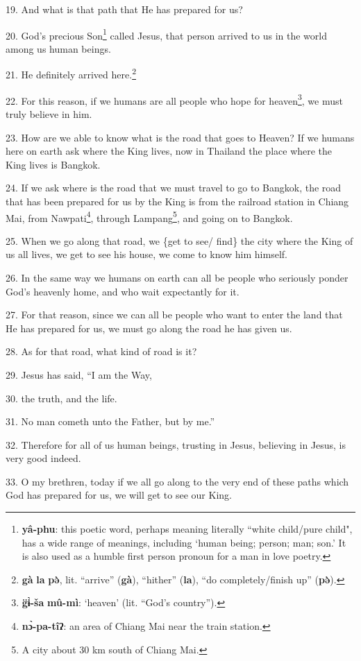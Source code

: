 19. And what is that path that He has prepared for us?

20. God's precious Son\footnote{\textbf{yâ-phu}: this poetic word, perhaps meaning literally ``white child/pure child", has a wide range of meanings, including `human being; person; man; son.' It is also used as a humble first person pronoun for a man in love poetry.} called Jesus, that person arrived to us in the world
among us human beings.

21. He definitely arrived here.\footnote{\textbf{gà} \textbf{la} \textbf{pə̀}, lit. ``arrive'' (\textbf{gà}), ``hither'' (\textbf{la}), ``do completely/finish up'' (\textbf{pə̀}).}

22. For this reason, if we humans are all people who hope for heaven\footnote{\textbf{g̈ɨ̀-ša} \textbf{mû-mì}: `heaven' (lit. ``God's country'').}, we must
truly believe in him.

23. How are we able to know what is the road that goes to Heaven? If we humans
here on earth ask where the King lives, now in Thailand the place where the King
lives is Bangkok.

24. If we ask where is the road that we must travel to go to Bangkok, the road
that has been prepared for us by the King is from the railroad station in Chiang
Mai, from Nawpati\footnote{\textbf{nɔ̀-pa-tîʔ}: an area of Chiang Mai near the train station.}, through Lampang\footnote{A city about 30 km south of Chiang Mai.}, and going on to Bangkok.

25. When we go along that road, we \{get to see/ find\} the city where the King
of us all lives, we get to see his house, we come to know him himself.

26. In the same way we humans on earth can all be people who seriously ponder God's
heavenly home, and who wait expectantly for it.

27. For that reason, since we can all be people who want to enter the land that
He has prepared for us, we must go along the road he has given us.

28. As for that road, what kind of road is it?

29. Jesus has said, ``I am the Way,

30. the truth, and the life.

31. No man cometh unto the Father, but by me.''

32. Therefore for all of us human beings, trusting in Jesus, believing in Jesus,
is very good indeed.

33. O my brethren, today if we all go along to the very end of these paths which
God has prepared for us, we will get to see our King.

